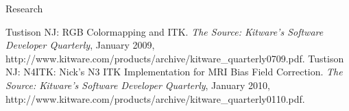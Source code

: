 \documentclass{resume}
\def\-{\discretionary{}{}{}}
\begin{document}
\begin{category}{Research}

   \begin{itemize}
   \citemnobullet Tustison NJ: RGB Colormapping and ITK.  {\em The Source:  Kitware's Software Developer Quarterly}, January 2009, http://\-www\-.\-kitware\-.\-com/\-products/\-archive/\-kitware\_\-quarterly\-0709\-.pdf.
   \citemnobullet Tustison NJ: N4ITK:  Nick's N3 ITK Implementation for MRI Bias Field Correction.  {\em The Source:  Kitware's Software Developer Quarterly}, January 2010, http://\-www\-.\-kitware\-.\-com/\-products/\-archive/\-kitware\_\-quarterly\-0110\-.pdf.
   \end{itemize}



\end{category}
\end{document}

